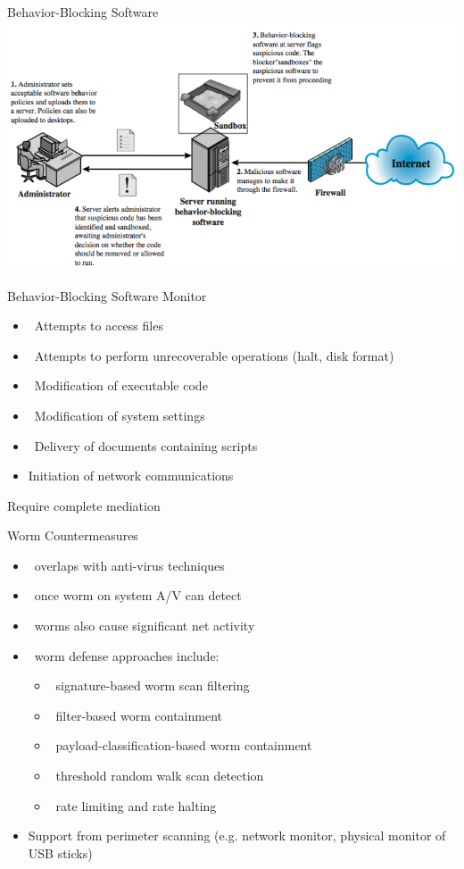 \documentclass{beamer}
\begin{document}

\begin{frame}{Behavior-Blocking Software}
\includegraphics[width=0.8\linewidth]{behaviorBlocking}
\end{frame}

\begin{frame}{Behavior-Blocking Software}
  Monitor
    \begin{itemize}
    \item  Attempts to access files
    \item  Attempts to perform unrecoverable operations (halt, disk format)
    \item  Modification of executable code
    \item  Modification of system settings
    \item  Delivery of documents containing scripts
    \item  Initiation of network communications
    \end{itemize}
    Require complete mediation
\end{frame}

 
\begin{frame}{Worm Countermeasures}
  \begin{itemize}
  \item  overlaps with anti-virus techniques 
  \item  once worm on system A/V can detect 
  \item  worms also cause significant net activity 
  \item  worm defense approaches include: 
    \begin{itemize}
    \item  signature-based worm scan filtering 
    \item  filter-based worm containment 
    \item  payload-classification-based worm containment 
    \item  threshold random walk scan detection 
    \item  rate limiting and rate halting 
    \end{itemize}
  \item Support from perimeter scanning (e.g. network monitor,
    physical monitor of USB sticks)
  \end{itemize}
\end{frame}
\end{document}
